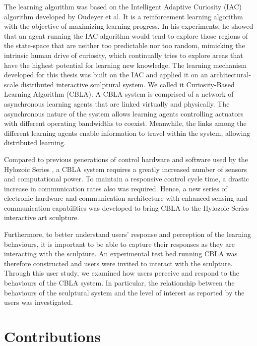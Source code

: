 The learning algorithm was based on the Intelligent Adaptive Curiosity \cite{Oudeyer2007} (IAC) algorithm developed by Oudeyer et al. It is a reinforcement learning algorithm with the objective of maximizing learning progress. In his experiments, he showed that an agent running the IAC algorithm would tend to explore those regions of the state-space that are neither too predictable nor too random, mimicking the intrinsic human drive of curiosity, which continually tries to explore areas that have the highest potential for learning new knowledge. The learning mechanism developed for this thesis was built on the IAC and applied it on an architectural-scale distributed interactive sculptural system. We called it Curiosity-Based Learning Algorithm (CBLA). A CBLA system is comprised of a network of asynchronous learning agents that are linked virtually and physically. The asynchronous nature of the system allows learning agents controlling actuators with different operating bandwidths to coexist. Meanwhile, the links among the different learning agents enable information to travel within the system, allowing distributed learning.

Compared to previous generations of control hardware and software used by the Hylozoic Series \cite{Beesley2010-1}, a CBLA system requires a greatly increased number of sensors and computational power. To maintain a responsive control cycle time, a drastic increase in communication rates also was required. Hence, a new series of electronic hardware and communication architecture with enhanced sensing and communication capabilities was developed to bring CBLA to the Hylozoic Series interactive art sculpture. 

Furthermore, to better understand users' response and perception of the learning behaviours, it is important to be able to capture their responses as they are interacting with the sculpture. An experimental test bed running CBLA was therefore constructed and users were invited to interact with the sculpture. Through this user study, we examined how users perceive and respond to the behaviours of the CBLA system. In particular, the relationship between the behaviours of the sculptural system and the level of interest as reported by the users was investigated. 

\section{Contributions}

